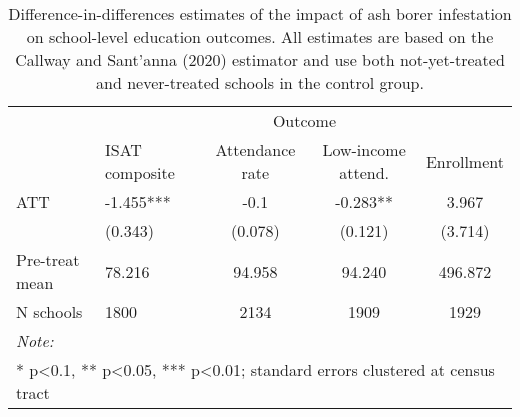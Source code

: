 \begin{table}[!h]

\caption{\label{tab:school-educ-table}Difference-in-differences estimates of the impact of ash borer infestation on school-level education outcomes. All estimates are based on the Callway and Sant'anna (2020) estimator and use both not-yet-treated and never-treated schools in the control group.}
\centering
\begin{tabular}[t]{llccc}
\toprule
\multicolumn{1}{c}{ } & \multicolumn{4}{c}{Outcome} \\
\cmidrule(l{3pt}r{3pt}){2-5}
  & ISAT composite & Attendance rate & Low-income attend. & Enrollment\\
\midrule
ATT & -1.455*** & -0.1 & -0.283** & 3.967\\
 & (0.343) & (0.078) & (0.121) & (3.714)\\
\midrule
Pre-treat mean & 78.216 & 94.958 & 94.240 & 496.872\\
N schools & 1800 & 2134 & 1909 & 1929\\
\bottomrule
\multicolumn{5}{l}{\rule{0pt}{1em}\textit{Note: }}\\
\multicolumn{5}{l}{\rule{0pt}{1em}* p<0.1, ** p<0.05, *** p<0.01; standard errors clustered at census tract}\\
\end{tabular}
\end{table}
